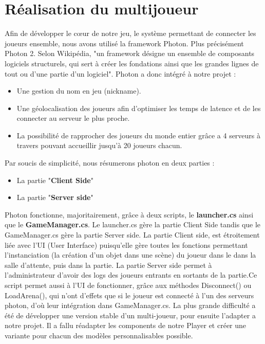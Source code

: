 \documentclass[french, 12pt]{article}
\begin{document}
    \section{Réalisation du multijoueur}
Afin de développer le cœur de notre jeu, le système permettant de connecter les joueurs ensemble, nous avons utilisé la framework Photon. Plus précisément Photon 2. \newline
Selon Wikipédia, "un framework désigne un ensemble de composants logiciels structurels, qui sert à créer les fondations ainsi que les grandes lignes de tout ou d’une partie d'un logiciel". \newline
Photon a donc intégré à notre projet :
\begin{itemize}
    \item Une gestion du nom en jeu (nickname).
    \item Une géolocalisation des joueurs afin d’optimiser les temps de latence et de les connecter au serveur le plus proche.
    \item La possibilité de rapprocher des joueurs du monde entier grâce a 4 serveurs à travers pouvant accueillir jusqu’à 20 joueurs chacun.
\end{itemize}
	

Par soucis de simplicité, nous résumerons photon en deux parties :
	\begin{itemize}
	\item       La partie "\textbf{Client Side}" 
	\item   	La partie "\textbf{Server side}"
	\end{itemize}
	Photon fonctionne, majoritairement, grâce à deux scripts, le \textbf{launcher.cs} ainsi que le \textbf{GameManager.cs}. Le launcher.cs gère la partie Client Side tandis que le GameManager.cs gère la partie Server side. \newline
	La partie Client side, est étroitement liée avec l’UI (User Interface) puisqu’elle gère toutes les fonctions permettant l’instanciation (la création d’un objet dans une scène) du joueur dans le dans la salle d’attente, puis dans la partie. 
	 La partie Server side permet à l’administrateur d’avoir des logs des joueurs entrants en sortants de la partie.\newline Ce script permet aussi à l’UI de fonctionner, grâce aux méthodes Disconnect() ou LoadArena(), qui n’ont d’effets que si le joueur est connecté à l’un des serveurs photon, d’où leur intégration dans GameManager.cs.\newline
	La plus grande difficulté a été de développer une version stable d’un multi-joueur, pour ensuite l’adapter a notre projet.  Il a fallu réadapter les components de notre Player et créer une variante pour chacun des modèles personnalisables possible. 
\end{document}
